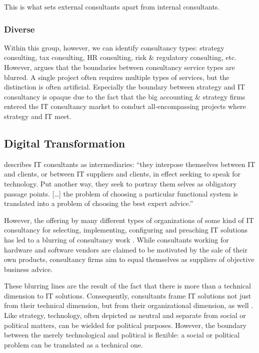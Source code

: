 \documentclass[12pt]{article}
\begin{document}
This is what sets external consultants apart from internal consultants.

\hypertarget{diverse}{%
\subsubsection{Diverse}\label{diverse}}

Within this group, however, we can identify consultancy types: strategy
consulting, tax consulting, HR consulting, risk \& regulatory
consulting, etc. However, \citet[71-72]{armbruster2006} argues that the
boundaries between consultancy service types are blurred. A single
project often requires multiple types of services, but the distinction
is often artificial. Especially the boundary between strategy and IT
consultancy is opaque due to the fact that the big accounting \&
strategy firms entered the IT consultancy market to conduct
all-encompassing projects where strategy and IT meet.

\hypertarget{digital-transformation}{%
\subsection{Digital Transformation}\label{digital-transformation}}

\citet[28]{bloomfield1995} describes IT consultants as intermediaries:
``they interpose themselves between IT and clients, or between IT
suppliers and clients, in effect seeking to speak for technology. Put
another way, they seek to portray them selves as obligatory passage
points. {[}\ldots{]} the problem of choosing a particular functional
system is translated into a problem of choosing the best expert
advice.''

However, the offering by many different types of organizations of some
kind of IT consultancy for selecting, implementing, configuring and
preaching IT solutions has led to a blurring of consultancy work
\citetext{\citealp[ 31]{bloomfield1995}; \citealp[ 162]{kipping2012}}.
While consultants working for hardware and software vendors are claimed
to be motivated by the sale of their own products, consultancy firms aim
to equal themselves as suppliers of objective business advice.

These blurring lines are the result of the fact that there is more than
a technical dimension to IT solutions. Consequently, consultants frame
IT solutions not just from their technical dimension, but from their
organizational dimension, as well \citep[ 24-25]{bloomfield1995}. Like
strategy, technology, often depicted as neutral and separate from social
or political matters, can be wielded for political purposes. However,
the boundary between the merely technological and political is flexible:
a social or political problem can be translated as a technical one.
\end{document}
